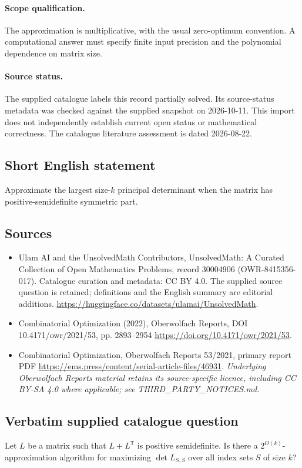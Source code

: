 \documentclass[11pt]{article}
\begin{document}
\paragraph{Scope qualification.}
The approximation is multiplicative, with the usual zero-optimum convention. A computational answer must specify finite input precision and the polynomial dependence on matrix size.
\paragraph{Source status.}
The supplied catalogue labels this record partially solved. Its source-status metadata was checked against the supplied snapshot on 2026-10-11. This import does not independently establish current open status or mathematical correctness. The catalogue literature assessment is dated 2026-08-22.
\subsection{Short English statement}
Approximate the largest size-$k$ principal determinant when the matrix has positive-semidefinite symmetric part.
\subsection{Sources}
\begin{itemize}
\item[S1] Ulam AI and the UnsolvedMath Contributors, UnsolvedMath: A Curated Collection of Open Mathematics Problems, record 30004906 (OWR-8415356-017). Catalogue curation and metadata: CC BY 4.0. The supplied source question is retained; definitions and the English summary are editorial additions.
\url{https://huggingface.co/datasets/ulamai/UnsolvedMath}.
\item[S2] Combinatorial Optimization (2022), Oberwolfach Reports, DOI 10.4171/owr/2021/53, pp. 2893--2954
\url{https://doi.org/10.4171/owr/2021/53}.
\item[S3] Combinatorial Optimization, Oberwolfach Reports 53/2021, primary report PDF
\url{https://ems.press/content/serial-article-files/46931}.
\textit{Underlying Oberwolfach Reports material retains its source-specific licence, including CC BY-SA 4.0 where applicable; see THIRD\_PARTY\_NOTICES.md.}
\end{itemize}
\subsection{Verbatim supplied catalogue question}
Let $L$ be a matrix such that $L+L^\mathsf T$ is positive semidefinite. Is there a $2^{O(k)}$-approximation algorithm for maximizing $\det L_{S,S}$ over all index sets $S$ of size $k$?
\end{document}
